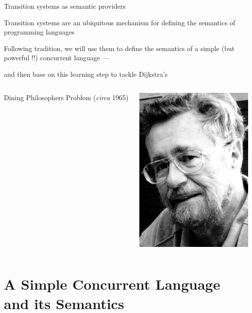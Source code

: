 \documentclass{beamer}
\begin{document}
\begin{frame}{Transition systems as semantic providers}

  Transition systems are an \alert{ubiquitous mechanism} for defining the
  semantics of programming languages 

  \vfill
  Following tradition, we will use them to define the
  semantics of a simple (but powerful !!) concurrent language ---

  and then base on this learning step to tackle Dijkstra's 

  \vspace{3.5pt}
  \begin{minipage}[0.3\textheight]{\textwidth}
  \begin{columns}[c]
  \begin{column}{0.7\textwidth}
    Dining Philosophers Problem (\emph{circa} 1965)
  \end{column}
  \begin{column}{0.22\textwidth}
    \includegraphics[scale=1.1]{images/Dijkstra.jpg}
  \end{column}
  \end{columns}
  \end{minipage}

\end{frame}

\section{A Simple Concurrent Language and its Semantics}
\end{document}
